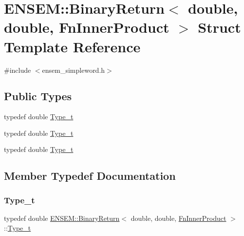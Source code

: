 \hypertarget{structENSEM_1_1BinaryReturn_3_01double_00_01double_00_01FnInnerProduct_01_4}{}\section{E\+N\+S\+EM\+:\+:Binary\+Return$<$ double, double, Fn\+Inner\+Product $>$ Struct Template Reference}
\label{structENSEM_1_1BinaryReturn_3_01double_00_01double_00_01FnInnerProduct_01_4}


{\ttfamily \#include $<$ensem\+\_\+simpleword.\+h$>$}

\subsection*{Public Types}
\begin{DoxyCompactItemize}
\item 
typedef double \mbox{\hyperlink{structENSEM_1_1BinaryReturn_3_01double_00_01double_00_01FnInnerProduct_01_4_ad70792f5fdfdd15bfa202a4282cb068b}{Type\+\_\+t}}
\item 
typedef double \mbox{\hyperlink{structENSEM_1_1BinaryReturn_3_01double_00_01double_00_01FnInnerProduct_01_4_ad70792f5fdfdd15bfa202a4282cb068b}{Type\+\_\+t}}
\item 
typedef double \mbox{\hyperlink{structENSEM_1_1BinaryReturn_3_01double_00_01double_00_01FnInnerProduct_01_4_ad70792f5fdfdd15bfa202a4282cb068b}{Type\+\_\+t}}
\end{DoxyCompactItemize}


\subsection{Member Typedef Documentation}
\mbox{\label{structENSEM_1_1BinaryReturn_3_01double_00_01double_00_01FnInnerProduct_01_4_ad70792f5fdfdd15bfa202a4282cb068b}} 
\subsubsection{\texorpdfstring{Type\_t}{Type\_t}\hspace{0.1cm}{\footnotesize\ttfamily [1/3]}}
{\footnotesize\ttfamily typedef double \mbox{\hyperlink{structENSEM_1_1BinaryReturn}{E\+N\+S\+E\+M\+::\+Binary\+Return}}$<$ double, double, \mbox{\hyperlink{structENSEM_1_1FnInnerProduct}{Fn\+Inner\+Product}} $>$\+::\mbox{\hyperlink{structENSEM_1_1BinaryReturn_3_01double_00_01double_00_01FnInnerProduct_01_4_ad70792f5fdfdd15bfa202a4282cb068b}{Type\+\_\+t}}}

